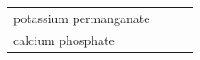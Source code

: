 \begin{enumerate}[noitemsep, label=\textbf{\arabic*}. ]
{\begin{tabular}[t]{|l|l|l|l|}
    
        potassium permanganate &
    
    
         &
    
    
         &
    
    
     \tabularnewline\cline{1-1}\cline{2-2}\cline{3-3}\cline{4-4}
    
    
        calcium phosphate &
    
    
         &
    
    
         &
    
    
     \tabularnewline\cline{1-1}\cline{2-2}\cline{3-3}\cline{4-4}
    \end{tabular}} %
      \addtocounter{footnote}{-0}
      

\end{enumerate}
